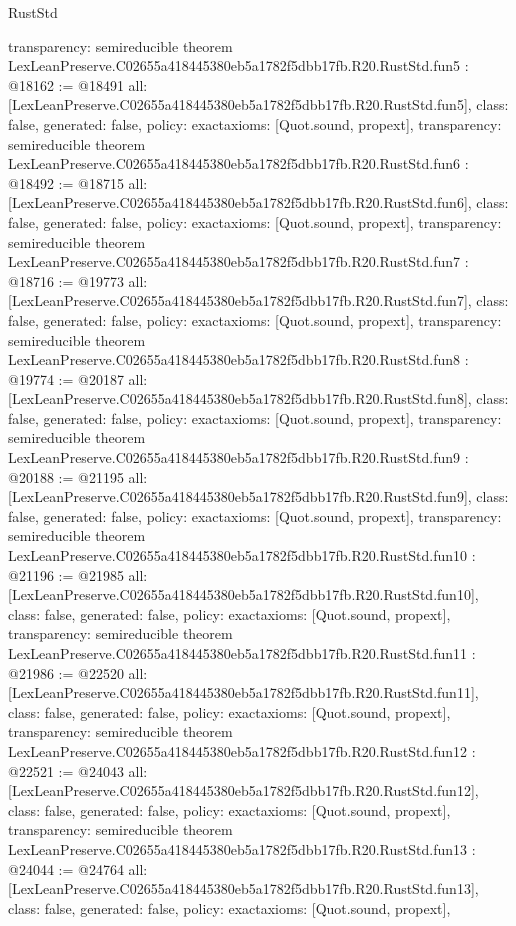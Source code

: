 \begin{lexlean}{RustStd}
\begin{coremodule}
{  transparency: semireducible
}
theorem LexLeanPreserve.C02655a418445380eb5a1782f5dbb17fb.R20.RustStd.fun5 : @18162 := @18491 {
  all: [LexLeanPreserve.C02655a418445380eb5a1782f5dbb17fb.R20.RustStd.fun5],
  class: false,
  generated: false,
  policy: exact{axioms: [Quot.sound, propext]},
  transparency: semireducible
}
theorem LexLeanPreserve.C02655a418445380eb5a1782f5dbb17fb.R20.RustStd.fun6 : @18492 := @18715 {
  all: [LexLeanPreserve.C02655a418445380eb5a1782f5dbb17fb.R20.RustStd.fun6],
  class: false,
  generated: false,
  policy: exact{axioms: [Quot.sound, propext]},
  transparency: semireducible
}
theorem LexLeanPreserve.C02655a418445380eb5a1782f5dbb17fb.R20.RustStd.fun7 : @18716 := @19773 {
  all: [LexLeanPreserve.C02655a418445380eb5a1782f5dbb17fb.R20.RustStd.fun7],
  class: false,
  generated: false,
  policy: exact{axioms: [Quot.sound, propext]},
  transparency: semireducible
}
theorem LexLeanPreserve.C02655a418445380eb5a1782f5dbb17fb.R20.RustStd.fun8 : @19774 := @20187 {
  all: [LexLeanPreserve.C02655a418445380eb5a1782f5dbb17fb.R20.RustStd.fun8],
  class: false,
  generated: false,
  policy: exact{axioms: [Quot.sound, propext]},
  transparency: semireducible
}
theorem LexLeanPreserve.C02655a418445380eb5a1782f5dbb17fb.R20.RustStd.fun9 : @20188 := @21195 {
  all: [LexLeanPreserve.C02655a418445380eb5a1782f5dbb17fb.R20.RustStd.fun9],
  class: false,
  generated: false,
  policy: exact{axioms: [Quot.sound, propext]},
  transparency: semireducible
}
theorem LexLeanPreserve.C02655a418445380eb5a1782f5dbb17fb.R20.RustStd.fun10 : @21196 := @21985 {
  all: [LexLeanPreserve.C02655a418445380eb5a1782f5dbb17fb.R20.RustStd.fun10],
  class: false,
  generated: false,
  policy: exact{axioms: [Quot.sound, propext]},
  transparency: semireducible
}
theorem LexLeanPreserve.C02655a418445380eb5a1782f5dbb17fb.R20.RustStd.fun11 : @21986 := @22520 {
  all: [LexLeanPreserve.C02655a418445380eb5a1782f5dbb17fb.R20.RustStd.fun11],
  class: false,
  generated: false,
  policy: exact{axioms: [Quot.sound, propext]},
  transparency: semireducible
}
theorem LexLeanPreserve.C02655a418445380eb5a1782f5dbb17fb.R20.RustStd.fun12 : @22521 := @24043 {
  all: [LexLeanPreserve.C02655a418445380eb5a1782f5dbb17fb.R20.RustStd.fun12],
  class: false,
  generated: false,
  policy: exact{axioms: [Quot.sound, propext]},
  transparency: semireducible
}
theorem LexLeanPreserve.C02655a418445380eb5a1782f5dbb17fb.R20.RustStd.fun13 : @24044 := @24764 {
  all: [LexLeanPreserve.C02655a418445380eb5a1782f5dbb17fb.R20.RustStd.fun13],
  class: false,
  generated: false,
  policy: exact{axioms: [Quot.sound, propext]},
}
\end{coremodule}
\end{lexlean}
